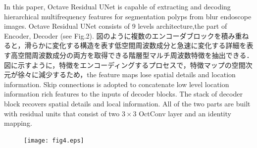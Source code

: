 \documentclass{article}
\begin{document}
In this paper, Octave Residual UNet is capable of extracting and decoding hierarchical multifrequency features for  segmentation polyps from blur endoscope images. Octave Residual UNet consists of 9 levels architecture,the part of Encoder, Decoder (see Fig.2).
図のように複数のエンコーダブロックを積み重ねると，滑らかに変化する構造を表す低空間周波数成分と急速に変化する詳細を表す高空間周波数成分の両方を取得できる階層型マルチ周波数特徴を抽出できる．図に示すように，特徴をエンコーディングするプロセスで，特徴マップの空間次元が徐々に減少するため，the feature maps lose spatial details and location information. Skip connections  is adopted to concatenate low level location information rich features to the inputs of decoder blocks. The stack of decoder block recovers spatial details and local information. All of the two parts are built with residual units that consist of two $3\times3$ OctConv layer and an identity mapping.


\begin{figure}[h]
\begin{center}
\texttt{[image: fig4.eps]}
\caption{}
\end{center}
\end{figure}
\end{document}
